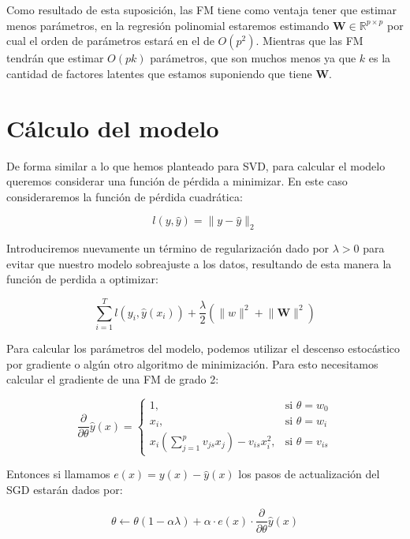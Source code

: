 \documentclass[hidelinks,12pt,a4paper]{book}
\providecommand{\norm}[1]{\lVert#1\rVert}
\theoremstyle{plain}
\theoremstyle{definition}
\begin{document}
Como resultado de esta suposición, las FM tiene como ventaja tener que estimar menos parámetros, en la regresión polinomial estaremos estimando $\textbf{W} \in \mathbb{R}^{p \times p}$ por cual el orden de parámetros estará en el de $O(p^2)$. Mientras que las FM tendrán que estimar $O(pk)$ parámetros, que son muchos menos ya que $k$ es la cantidad de factores latentes que estamos suponiendo que tiene $\textbf{W}$.

\section{Cálculo del modelo}

De forma similar a lo que hemos planteado para SVD, para calcular el modelo queremos considerar una función de pérdida a minimizar. En este caso consideraremos la función de pérdida cuadrática:

\begin{equation}
l(y,\hat{y}) = \norm{y-\hat{y}}_2	
\end{equation}

Introduciremos nuevamente un término de regularización dado por $\lambda >0$ para evitar que nuestro modelo sobreajuste a los datos, resultando de esta manera la función de perdida a optimizar:

\begin{equation}
\label{FMlossreg}
\sum_{i=1}^{T} l(y_i,\hat{y}(x_i)) + \frac{\lambda}{2} (\norm{w}^2 + \norm{\textbf{W}}^2)
\end{equation}

Para calcular los parámetros del modelo, podemos utilizar el descenso estocástico por gradiente o algún otro algoritmo de minimización. Para esto necesitamos calcular el gradiente de una FM de grado 2:

\begin{equation}
\frac{\partial}{\partial \theta} \hat{y}(x) =
\begin{cases}
1, &\text{si } \theta=w_0 \\
x_i, &\text{si } \theta=w_i \\
x_i (\sum_{j=1}^p v_{js} x_j) - v_{is}x_i^2, &\text{si } \theta=v_{is}
\end{cases}
\end{equation}

Entonces si llamamos $e(x) = y(x) - \hat{y}(x)$ los pasos de actualización del SGD estarán dados por:

\begin{equation}
\theta \leftarrow \theta(1-\alpha \lambda) + \alpha \cdot e(x) \cdot \frac{\partial}{\partial \theta} \hat{y}(x)
\end{equation}
\end{document}
